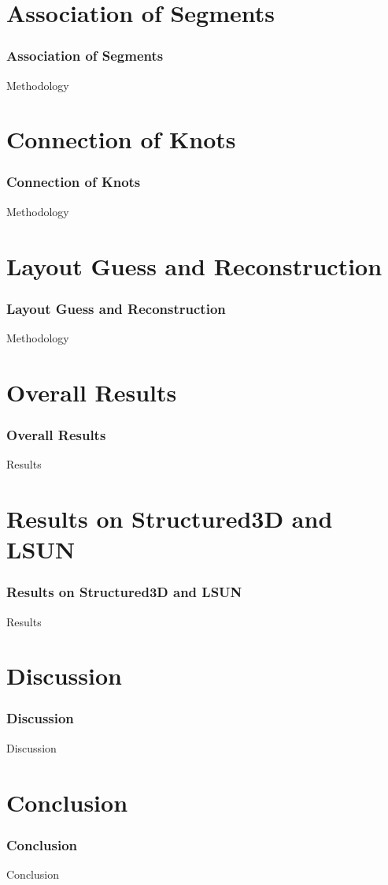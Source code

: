 \documentclass{beamer}
\begin{document}
\section{Association of Segments}
\begin{frame}
\frametitle{Association of Segments}
Methodology
\end{frame}

\section{Connection of Knots}
\begin{frame}
\frametitle{Connection of Knots}
Methodology
\end{frame}

\section{Layout Guess and Reconstruction}
\begin{frame}
\frametitle{Layout Guess and Reconstruction}
Methodology
\end{frame}

\section{Overall Results}
\begin{frame}
\frametitle{Overall Results}
Results
\end{frame}

\section{Results on Structured3D and LSUN}
\begin{frame}
\frametitle{Results on Structured3D and LSUN}
Results
\end{frame}

\section{Discussion}
\begin{frame}
\frametitle{Discussion}
Discussion
\end{frame}

\section{Conclusion}
\begin{frame}
\frametitle{Conclusion}
Conclusion
\end{frame}
\end{document}
